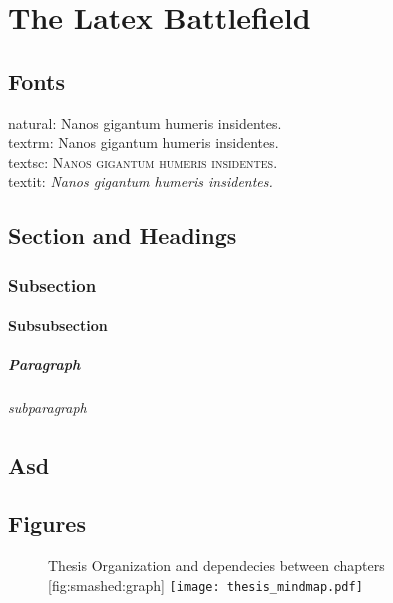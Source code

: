 \chapter{The Latex Battlefield}\label{chap:latex}


\section{Fonts}
natural: Nanos gigantum humeris insidentes.
\\textrm: \textrm{Nanos gigantum humeris insidentes.}
\\textsc: \textsc{Nanos gigantum humeris insidentes.}
\\textit: \textit{Nanos gigantum humeris insidentes.}


\section{Section and Headings}
\subsection{Subsection}
\subsubsection{Subsubsection}

\paragraph{Paragraph}
\blindtext[1]

\subparagraph{subparagraph}
\blindtext[1]

\blindtext[1]

\lipsum[1]


\section{Asd}
\blindtext

\section{Figures}
\begin{figure}[t]
        \begin{sidecaption}{%
                Thesis Organization and dependecies between chapters
        }[fig:smashed:graph]
        \centering
        \texttt{[image: thesis\_mindmap.pdf]}
        \end{sidecaption}
\end{figure}

